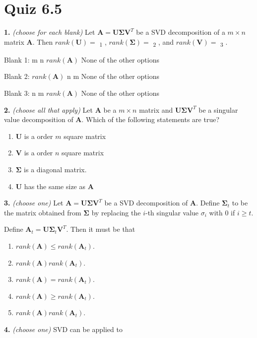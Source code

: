 \documentclass[10pt,a4paper]{article}
\begin{document}
\section{Quiz 6.5}
\textbf{1.} \textit{(choose for each blank)} Let \(\mathbf{A=U\Sigma V}^T\) be a SVD decomposition of a \(m\times n\) matrix \(\mathbf{A}\). Then \(rank(\mathbf{U})=\) \underline{\hspace{1.2cm}}\textsubscript{1} 
, \(rank(\mathbf{\Sigma})=\) \underline{\hspace{1.2cm}}\textsubscript{2} 
, and \(rank(\mathbf{V})=\) \underline{\hspace{1.2cm}}\textsubscript{3} 
.

\quad Blank 1: m \textbar{} n \textbar{} \(rank(\mathbf{A})\) \textbar{} None of the other options

\quad Blank 2: \(rank(\mathbf{A})\) \textbar{} n \textbar{} m \textbar{} None of the other options

\quad Blank 3: n \textbar{} m \textbar{} \(rank(\mathbf{A})\) \textbar{} None of the other options

\smallskip
\textbf{2.} \textit{(choose all that apply)} Let \(\mathbf{A}\) be a \(m\times n \) matrix and \(\mathbf{U\Sigma V}^T\) be a singular value decomposition of \(\mathbf{A}\). Which of the following statements are true?

\begin{enumerate}[label=(\Alph*)]
\item \(\mathbf{U}\) is a order \(m\) square matrix
\item \(\mathbf{V}\) is a order \(n\) square matrix
\item \(\mathbf{\Sigma}\) is a diagonal matrix.
\item \(\mathbf{U}\) has the same size as \(\mathbf{A}\)
\end{enumerate}
\smallskip
\textbf{3.} \textit{(choose one)} Let \(\mathbf{A=U\Sigma V}^T\) be a SVD decomposition of \(\mathbf{A}\). Define \(\mathbf{\Sigma}_t\) to be the matrix obtained from \(\mathbf{\Sigma}\) by replacing the \(i\)-th singular value \(\sigma_i\) with \(0\) if \(i\geq t\). 

Define \(\mathbf{A}_t=\mathbf{U\Sigma}_t\mathbf{V}^T\). Then it must be that

\begin{enumerate}[label=(\Alph*)]
\item \(rank(\mathbf{A})\leq rank(\mathbf{A}_t)\).
\item \(rank(\mathbf{A}) rank(\mathbf{A}_t)\).
\item \(rank(\mathbf{A})=rank(\mathbf{A}_t)\).
\item \(rank(\mathbf{A})\geq rank(\mathbf{A}_t)\).
\item \(rank(\mathbf{A})rank(\mathbf{A}_t)\).
\end{enumerate}
\smallskip
\textbf{4.} \textit{(choose one)} SVD can be applied to
\end{document}
